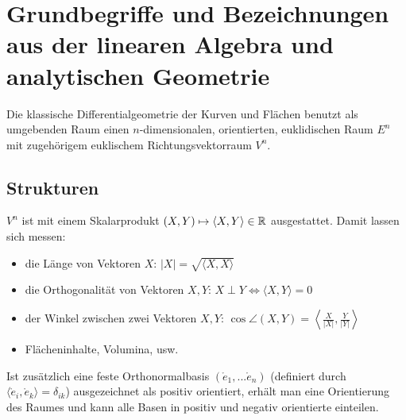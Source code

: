 \chapter{Grundbegriffe und Bezeichnungen aus der linearen Algebra und analytischen Geometrie}
  
  Die klassische Differentialgeometrie der Kurven und Flächen benutzt als umgebenden Raum einen \(n\)-dimensionalen, orientierten, euklidischen Raum \(E^n\) mit zugehörigem euklischem Richtungsvektorraum \(V^n\).

\section{Strukturen}
\(V^n\) ist mit einem Skalarprodukt \((X,Y) \mapsto \langle X, Y \rangle \in \mathbb{R}\) ausgestattet. 
Damit lassen sich messen:
  \begin{itemize}
   \item die Länge von Vektoren \(X\): \(|X| = \sqrt{ \langle X,X \rangle }\)
   \item die Orthogonalität von Vektoren \(X, Y\): \(X \perp Y \Leftrightarrow \langle X, Y \rangle = 0\)
   \item der Winkel zwischen zwei Vektoren \(X, Y\): \(\cos \angle (X, Y) = \left\langle \frac{X}{|X|}, \frac{Y}{|Y|} \right\rangle \)
   \item Flächeninhalte, Volumina, usw.
  \end{itemize}
Ist zusätzlich eine feste Orthonormalbasis \( (\mathring{e}_1, ... \mathring{e}_n) \) (definiert durch \( \langle \mathring{e}_i, \mathring{e}_k \rangle = \delta_{ik} \)) ausgezeichnet als positiv orientiert, erhält man eine Orientierung des Raumes und kann alle Basen in positiv und negativ orientierte einteilen.
  
